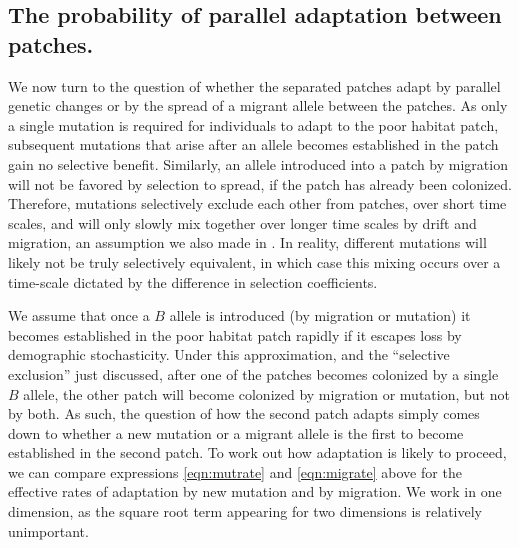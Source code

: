 \documentclass[10pt,letterpaper]{article}
\newcommand{\citep}[1]{\cite{#1}}
\begin{document}
\subsection*{The probability of parallel adaptation between patches.} 
\label{ss:probparallel}

We now turn to the question of whether the separated patches adapt by parallel genetic changes 
or by the spread of a migrant allele between the patches.
As only a single mutation is required for individuals to adapt to the
poor habitat patch, subsequent mutations that arise after an allele becomes established in the patch gain no selective benefit. 
Similarly, an allele introduced into a patch by migration will not be favored by selection to spread, 
if the patch has already been colonized. 
Therefore, mutations selectively exclude each other from patches, over short time scales, 
and will only slowly mix together over longer time scales by drift and migration,
an assumption we also made in \citep{ralph2010parallel}. 
In reality, different mutations will likely not be truly selectively equivalent,
in which case this mixing occurs over a time-scale dictated by the difference in selection coefficients.

We assume that once a $B$ allele is introduced (by migration or mutation) 
it becomes established in the poor habitat patch rapidly
if it escapes loss by demographic stochasticity.
Under this approximation, and the ``selective exclusion'' just discussed,
after one of the patches becomes colonized by a single $B$ allele, 
the other patch will become colonized by migration or mutation, but not by both. 
As such, the question of how the second patch adapts
simply comes down to whether a new mutation or a migrant allele is the first to become established in the second patch. 
To work out how adaptation is likely to proceed, 
we can compare expressions \eqref{eqn:mutrate} and \eqref{eqn:migrate} above
for the effective rates of adaptation by new mutation and by migration.
We work in one dimension, as the square root term appearing for two dimensions is relatively unimportant.
\end{document}
